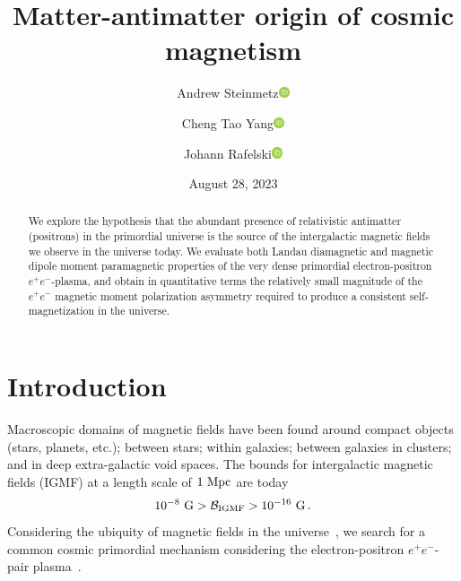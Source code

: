 \documentclass[aps,prd,floatfix,reprint]{revtex4-2}
\newcommand{\orcidicon}{\includegraphics[width=0.32cm]{orcid.pdf}}
\newcommand{\orc}[1]{\href{https://orcid.org/#1}{\orcidicon}}
\newcommand{\orcA}{0000-0001-8217-1484}
\newcommand{\orcB}{0000-0001-5038-8427}
\newcommand{\orcC}{0000-0001-5474-2649}
\begin{document}
\title{Matter-antimatter origin of cosmic magnetism}
\author{Andrew Steinmetz\orc{\orcC}}
\author{Cheng Tao Yang\orc{\orcB}}
\author{Johann Rafelski\orc{\orcA}}

\date{August 28, 2023}

\begin{abstract}
We explore the hypothesis that the abundant presence of relativistic antimatter (positrons) in the primordial universe is the source of the intergalactic magnetic fields we observe in the universe today. We evaluate both Landau diamagnetic and magnetic dipole moment paramagnetic properties of the very dense primordial electron-positron $e^{+}e^{-}$-plasma, and obtain in quantitative terms the relatively small magnitude of the $e^{+}e^{-}$ magnetic moment polarization asymmetry required to produce a consistent self-magnetization in the universe.
\end{abstract}


\maketitle

\section{Introduction}
\label{sec:introduction}
\noindent Macroscopic domains of magnetic fields have been found around compact objects (stars, planets, etc.); between stars; within galaxies; between galaxies in clusters; and in deep extra-galactic void spaces. The bounds for intergalactic magnetic fields (IGMF)  at a length scale of $1{\rm\ Mpc}$ are today~\cite{Neronov:2010gir,Taylor:2011bn,Pshirkov:2015tua,Jedamzik:2018itu,Vernstrom:2021hru}
\begin{align}
 \label{igmf}
 10^{-8}{\rm\ G}>\mathcal{B}_{\rm IGMF}>10^{-16}{\rm\ G}\,.
\end{align}
Considering the ubiquity of magnetic fields in the universe~\cite{Giovannini:2017rbc,Giovannini:2003yn,Kronberg:1993vk}, we search for a common cosmic primordial mechanism considering the electron-positron $e^{+}e^{-}$-pair plasma~\cite{Rafelski:2023emw,Grayson:2023flr}.
\end{document}
